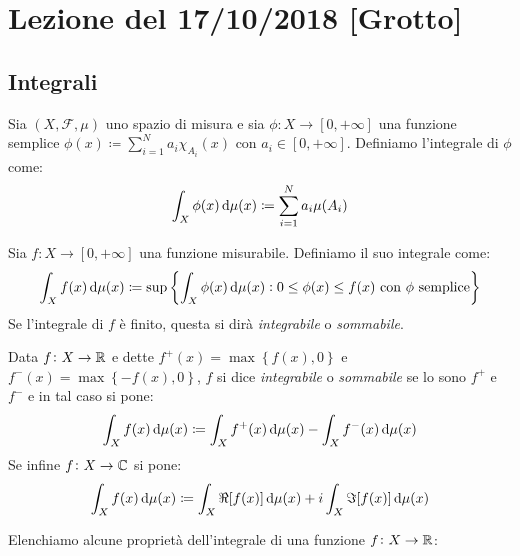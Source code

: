 \section{Lezione del 17/10/2018 [Grotto]}
\subsection{Integrali}
\begin{definition}
    Sia $ (X,\mathcal{F},\mu) $ uno spazio di misura e sia $ \phi\colon X\to [0,+\infty] $ una funzione semplice $ \phi(x) \coloneqq \sum_{i=1}^N a_i\chi_{A_i}(x)$ con $ a_i\in[0,+\infty] $. Definiamo l'integrale di $ \phi $ come:
    \[ \int_X \phi(x)\dif\mu(x) \coloneqq \sum_{i=1}^{N} a_i \mu(A_i) \]
\end{definition}
\begin{definition}
    Sia $ f\colon X\to [0,+\infty] $ una funzione misurabile. Definiamo il suo integrale come:
    \[ \int_X f(x)\dif\mu(x) \coloneqq \sup\left\{ \int_X \phi(x)\dif\mu(x) : 0 \leq \phi(x) \leq f(x) \text{ con $\phi$ semplice} \right\} \]
    Se l'integrale di $ f $ è finito, questa si dirà \emph{integrabile} o \emph{sommabile}.
\end{definition}
\begin{definition}[Integrale]
    Data $ f\colon X\to\mathbb{R} $ e dette $ f^+(x) = \max\left\{f(x),0\right\} $ e $ f^-(x) = \max\left\{-f(x), 0\right\} $, $ f $ si dice \emph{integrabile} o \emph{sommabile} se lo sono $ f^+ $ e $ f^- $ e in tal caso si pone:
    \[ \int_X f(x)\dif\mu(x) \coloneqq \int_X f^+(x)\dif\mu(x) - \int_X f^-(x)\dif\mu(x) \]
    Se infine $ f\colon X\to\mathbb{C} $ si pone:
    \[ \int_X f(x)\dif\mu(x) \coloneqq \int_X\Re[f(x)]\dif\mu(x) + i\int_X\Im[f(x)]\dif\mu(x) \]
\end{definition}
Elenchiamo alcune proprietà dell'integrale di una funzione $ f\colon X\to \mathbb{R} $:
